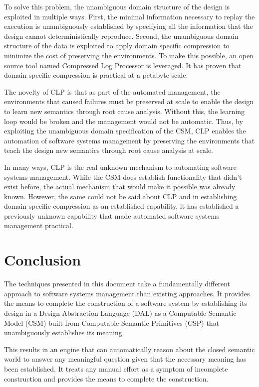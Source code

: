 \documentclass{article}
\begin{document}
To solve this problem, the unambiguous domain structure of the design is exploited in multiple ways. First, the minimal information necessary to replay the execution is unambiguously established by specifying all the information that the design cannot deterministically reproduce. Second, the unambiguous domain structure of the data is exploited to apply domain specific compression to minimize the cost of preserving the environments. To make this possible, an open source tool named Compressed Log Processor is leveraged. It has proven that domain specific compression is practical at a petabyte scale.

The novelty of CLP is that as part of the automated management, the environments that caused failures must be preserved at scale to enable the design to learn new semantics through root cause analysis. Without this, the learning loop would be broken and the management would not be automatic. Thus, by exploiting the unambiguous domain specification of the CSM, CLP enables the automation of software systems management by preserving the environments that teach the design new semantics through root cause analysis at scale.

In many ways, CLP is the real unknown mechanism to automating software systems management. While the CSM does establish functionality that didn't exist before, the actual mechanism that would make it possible was already known. However, the same could not be said about CLP and in establishing domain specific compression as an established capability, it has established a previously unknown capability that made automated software systems management practical. 

\section{Conclusion}

The techniques presented in this document take a fundamentally different approach to software systems management than existing approaches. It provides the means to complete the construction of a software system by establishing its design in a Design Abstraction Language (DAL) as a Computable Semantic Model (CSM) built from Computable Semantic Primitives (CSP) that unambiguously establishes its meaning.

This results in an engine that can automatically reason about the closed semantic world to answer any meaningful question given that the necessary meaning has been established. It treats any manual effort as a symptom of incomplete construction and provides the means to complete the construction. 
\end{document}
